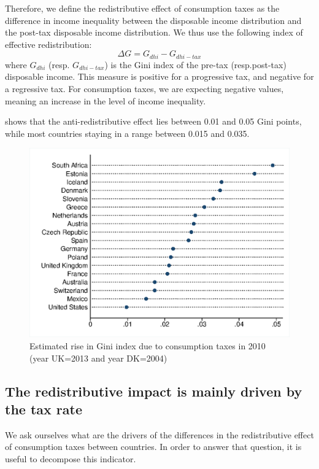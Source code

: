 \documentclass[12pt]{article}
\begin{document}
Therefore, we define the redistributive effect of consumption taxes as the difference in income inequality between the disposable income distribution and the post-tax disposable income distribution. We thus use the following index of effective redistribution:
\[ \Delta G = G_{dhi} - G_{dhi-tax} \]
where $G_{dhi}$ (resp. $G_{dhi-tax}$) is the Gini index of the pre-tax (resp.post-tax) disposable income. This measure is positive for a progressive tax, and negative for a regressive tax. For consumption taxes, we are expecting negative values, meaning an increase in the level of income inequality.

 shows that the anti-redistributive effect lies between 0.01 and 0.05 Gini points, while most countries staying in a range between 0.015 and 0.035.

\begin{figure}
\centering
\includegraphics[height=0.42\textheight]{"images/19-02 G_diff_ours_pred mod2 2010"}
\caption{Estimated rise in Gini index due to consumption taxes in 2010 \\ (year UK=2013 and year DK=2004)}
\label{fig:vatgini} 
\end{figure}


\subsection{The redistributive impact is mainly driven by the tax rate}
We ask ourselves what are the drivers of the differences in the redistributive effect of consumption taxes between countries. In order to answer that question, it is useful to decompose this indicator.
\end{document}
